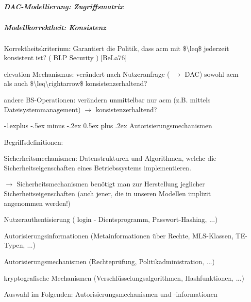 \documentclass[a4paper]{article}
\makeatletter
\renewcommand{\subsection}{\@startsection{subsection}{2}{0mm}%
 {-1explus -.5ex minus -.2ex}%
 {0.5ex plus .2ex}%
 {\normalfont\normalsize\bfseries}}
\makeatother
\begin{document}
\begin{multicols}{3}
    \subparagraph{DAC-Modellierung:
        Zugriffsmatrix}



    \subparagraph{Modellkorrektheit:
        Konsistenz}

    \begin{itemize*}
        \item
        Korrektheitskriterium: Garantiert die Politik, dass acm mit
        \$\textbackslash leq\$ jederzeit konsistent ist? ( BLP Security )
        {[}BeLa76{]}
        \item
        elevation-Mechanismus: verändert nach Nutzeranfrage
        ( $\rightarrow$ DAC) sowohl acm als auch
        \$\textbackslash leq\textbackslash rightarrow\$ konsistenzerhaltend?
        \item
        andere BS-Operationen: verändern unmittelbar nur acm (z.B. mittels
        Dateisystemmanagement) $\rightarrow$
        konsistenzerhaltend?
    \end{itemize*}


    \subsection{Autorisierungsmechanismen}

    Begriffsdefinitionen:

    \begin{itemize*}
        \item
        Sicherheitsmechanismen: Datenstrukturen und Algorithmen, welche die
        Sicherheitseigenschaften eines Betriebssystems implementieren.
        \begin{itemize*}
            \item $\rightarrow$ Sicherheitsmechanismen benötigt man zur Herstellung jeglicher Sicherheitseigenschaften (auch jener, die in unseren Modellen implizit angenommen werden!)
            \item Nutzerauthentisierung ( login - Dientsprogramm, Passwort-Hashing, ...)
            \item Autorisierungsinformationen (Metainformationen über Rechte, MLS-Klassen, TE-Typen, ...)
            \item Autorisierungsmechanismen (Rechteprüfung, Politikadministration, ...)
            \item kryptografische Mechanismen (Verschlüsselungsalgorithmen, Hashfunktionen, ...)
        \end{itemize*}
        \item
        Auswahl im Folgenden: Autorisierungsmechanismen und -informationen
    \end{itemize*}



\end{multicols}
\end{document}

